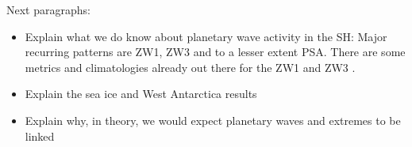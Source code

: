 Next paragraphs:
\begin{itemize}
\item Explain what we do know about planetary wave activity in the SH: Major recurring patterns are ZW1, ZW3 and to a lesser extent PSA. There are some metrics and climatologies already out there for the ZW1 and ZW3 \citep{Raphael2004,Hobbs2007}.
\item Explain the sea ice and West Antarctica results
\item Explain why, in theory, we would expect planetary waves and extremes to be linked
\end{itemize}

